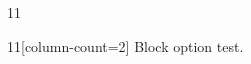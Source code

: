 \documentclass[paper=A4]{ropas-poster}
\begin{document}
\begin{postergrid}{1}{1}
\begin{posterblock}{1}{1}[column-count=2]
Block option test.
\end{posterblock}
\end{postergrid}
\end{document}
